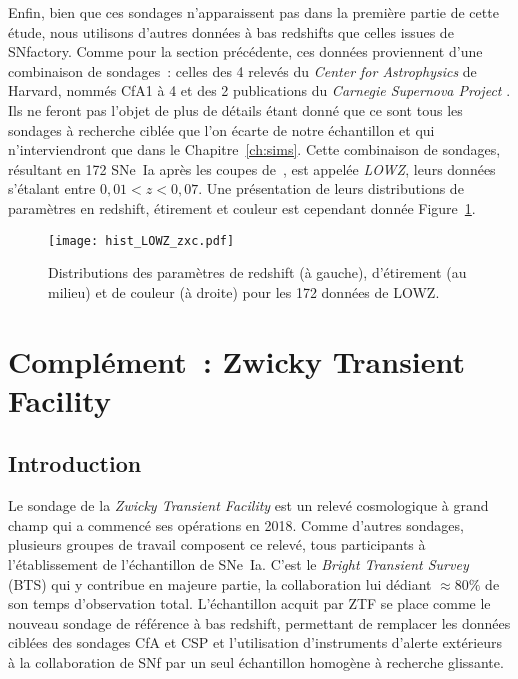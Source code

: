 \documentclass[../main/main.tex]{subfiles}
\begin{document}
Enfin, bien que ces sondages n'apparaissent pas dans la première partie de cette
étude, nous utilisons d'autres données à bas redshifts que celles issues de
SNfactory. Comme pour la section précédente, ces données proviennent d'une
combinaison de sondages~: celles des 4 relevés du \textit{Center for
Astrophysics} de Harvard, nommés CfA1 à 4 \citep{riess1999, jha2006,
hicken2009a, hicken2009b, hicken2012} et des 2 publications du \textit{Carnegie
Supernova Project} \citep[CSP,][]{contreras2010, folatelli2010,
stritzinger2011}. Ils ne feront pas l'objet de plus de détails étant donné que
ce sont tous les sondages à recherche ciblée que l'on écarte de notre
échantillon et qui n'interviendront que dans le Chapitre~\ref{ch:sims}. Cette
combinaison de sondages, résultant en 172 SNe~Ia après les coupes
de~\cite{scolnic2018}, est appelée \textit{LOWZ}, leurs données s'étalant entre
$0,01 < z < 0,07$. Une présentation de leurs distributions de paramètres en
redshift, étirement et couleur est cependant donnée Figure~\ref{fig:lowzhist}.

\begin{figure}[ht]
    \centering
    \texttt{[image: hist\_LOWZ\_zxc.pdf]}
    \caption[Distributions des paramètres de redshift, étirement et couleur de
    LOWZ]{Distributions des paramètres de redshift (à gauche), d'étirement (au
    milieu) et de couleur (à droite) pour les 172 données de LOWZ.}
    \label{fig:lowzhist}
\end{figure}

\section{Complément~: Zwicky Transient Facility}\label{sec:ztf}
\subsection{Introduction}\label{ssec:ztfintro}

Le sondage de la \textit{Zwicky Transient Facility} \citep[ZTF,][]{bellm2019,
dekany2020} est un relevé cosmologique à grand champ qui a commencé ses
opérations en 2018. Comme d'autres sondages, plusieurs groupes de travail
composent ce relevé, tous participants à l'établissement de l'échantillon de
SNe~Ia. C'est le \textit{Bright Transient Survey} (BTS) qui y contribue en
majeure partie, la collaboration lui dédiant $\approx 80\%$ de son temps
d'observation total. L'échantillon acquit par ZTF se place comme le nouveau
sondage de référence à bas redshift, permettant de remplacer les données ciblées
des sondages CfA et CSP et l'utilisation d'instruments d'alerte extérieurs à la
collaboration de SNf par un seul échantillon homogène à recherche glissante.
\end{document}
